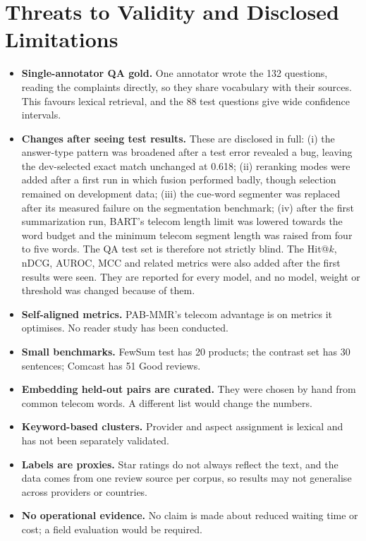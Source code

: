 \documentclass[11pt,a4paper]{article}
\begin{document}
\section{Threats to Validity and Disclosed Limitations}\label{sec:threats}
\begin{itemize}
\item \textbf{Single-annotator QA gold.} One annotator wrote the 132 questions, reading the complaints directly, so they share vocabulary with their sources. This favours lexical retrieval, and the 88 test questions give wide confidence intervals.
\item \textbf{Changes after seeing test results.} These are disclosed in full: (i) the answer-type pattern was broadened after a test error revealed a bug, leaving the dev-selected exact match unchanged at 0.618; (ii) reranking modes were added after a first run in which fusion performed badly, though selection remained on development data; (iii) the cue-word segmenter was replaced after its measured failure on the segmentation benchmark; (iv) after the first summarization run, BART's telecom length limit was lowered towards the word budget and the minimum telecom segment length was raised from four to five words. The QA test set is therefore not strictly blind. The Hit@$k$, nDCG, AUROC, MCC and related metrics were also added after the first results were seen. They are reported for every model, and no model, weight or threshold was changed because of them.
\item \textbf{Self-aligned metrics.} PAB-MMR's telecom advantage is on metrics it optimises. No reader study has been conducted.
\item \textbf{Small benchmarks.} FewSum test has 20 products; the contrast set has 30 sentences; Comcast has 51 Good reviews.
\item \textbf{Embedding held-out pairs are curated.} They were chosen by hand from common telecom words. A different list would change the numbers.
\item \textbf{Keyword-based clusters.} Provider and aspect assignment is lexical and has not been separately validated.
\item \textbf{Labels are proxies.} Star ratings do not always reflect the text, and the data comes from one review source per corpus, so results may not generalise across providers or countries.
\item \textbf{No operational evidence.} No claim is made about reduced waiting time or cost; a field evaluation would be required.
\end{itemize}
\end{document}
